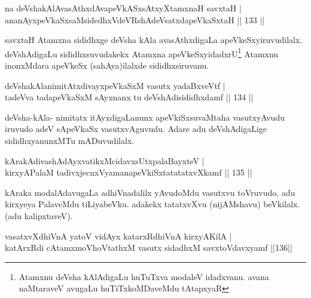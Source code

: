 
\begin{shl}
na deVshakAlAvasAthxdAvapeVkASx\s sAtxyXtamxnaH  savxtaH |\\
ananAyxpeVkaSxsaMsidedhxVdeVRshAdeVsatxdapeVkaSxtaH \hfill || 133 ||
\end{shl}

\begin{artha}
savxtaH Atamxna sididhxge deVsha kAla avasAthxdigaLa apeVkeSxyiruvudilalx. deVshAdigaLu sididhxsuvudakekx Atamxna apeVkeSxyidadxrU\footnote{Atamxnu deVsha kAlAdigaLu huTuTxva modaleV idadxvanu. avana naMtaraveV avugaLu huTiTxkoMDaveMdu tAtapxyaR} Atamxnu inonxMdara apeVkeSx (sahAya)ilalxde sididhxsiruvanu.
\end{artha}


\begin{shl}
deVshakAlanimitAtxdivayxpeVkaSxM vasutx yadaBxveVtf |\\
tadeVva tadapeVkaSxM sAyxnanx tu deVshAdisididhxdamf \hfill || 134 ||
\end{shl}

\begin{artha}
deVsha-kAla- nimitatx itAyxdigaLanunx apeVkiSxsuvaMtaha vasutx\break yAvudu iruvudo adeV sApeVkaSx vasutxvAguvudu. Adare adu deVshAdigaLige sididhxyanunxMTu mADuvudilalx.
\end{artha}


\begin{shl}
kArakAdivashAdAyxvatikxMcidavxsUtxpalaBayxteV |\\
kirxyAPalaM tadivxjecnxVyamanapeVkiSxtatatatxvXkamf \hfill || 135 ||
\end{shl}

\begin{artha}
kAraka modalAdavugaLa adhiVnadalilx yAvudoMdu vasutxvu toVruvudo, adu kirxyeya PalaveMdu tiLiyabeVku. adakekx tatatxvXvu (nijAMshavu) beVkilalx. (adu kalipxtaveV).
\end{artha}


\begin{shl}
vasatxvXdhiVnA yatoV vidAyx katarxRdhiVnA kirxyA\s KilA |\\
katArxRdi cA\s \s tamxmoVhoVtathxM vasutx sidadhxM savxtoV\s davxyamf \hfill ||136||
\end{shl}

